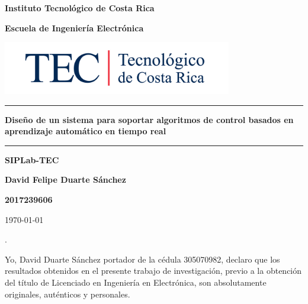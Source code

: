 \documentclass[12pt]{article}
\begin{document}
\begin{titlepage}

  \centering


  \vspace{10cm}

  \textbf{\LARGE Instituto Tecnológico de Costa Rica}

  \vspace{2cm}

  \textbf{\LARGE Escuela de Ingeniería Electrónica}

  \vspace{2cm}

  \includegraphics[width=10cm]{logotec/image.png}
  \vspace{2cm}

  \hrule

  \vspace{1cm}

  \textbf{\LARGE Diseño de un sistema para soportar algoritmos de control basados en aprendizaje automático en tiempo real}

  \vspace{1cm}

  \hrule

  \vspace{1cm}

  \textbf{\LARGE SIPLab-TEC}

  \vspace{1cm}

  \textbf{\LARGE David Felipe Duarte Sánchez}

  \vspace{1cm}

  \textbf{\LARGE 2017239606}

  \vspace{1cm}

  \today %

\end{titlepage}
.
\par
\vspace{16cm} %

Yo, David Duarte Sánchez portador de la cédula 305070982, declaro que los resultados obtenidos en el presente trabajo de investigación, previo a la obtención del título de Licenciado en Ingeniería en Electrónica, son absolutamente originales, auténticos y personales.
\end{document}
